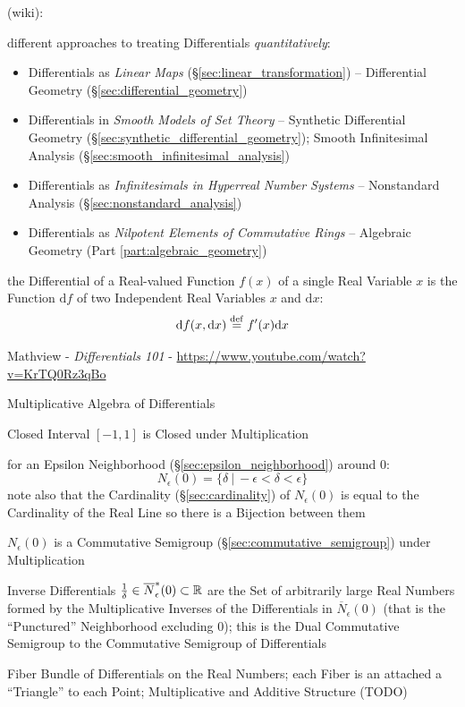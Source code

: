 {(wiki):

different approaches to treating Differentials \emph{quantitatively}:
\begin{itemize}
  \item Differentials as \emph{Linear Maps} (\S\ref{sec:linear_transformation})
    -- Differential Geometry (\S\ref{sec:differential_geometry})
  \item Differentials in \emph{Smooth Models of Set Theory} -- Synthetic
    Differential Geometry (\S\ref{sec:synthetic_differential_geometry}); Smooth
    Infinitesimal Analysis (\S\ref{sec:smooth_infinitesimal_analysis})
  \item Differentials as \emph{Infinitesimals in Hyperreal Number Systems} --
    Nonstandard Analysis (\S\ref{sec:nonstandard_analysis})
  \item Differentials as \emph{Nilpotent Elements of Commutative Rings} --
    Algebraic Geometry (Part \ref{part:algebraic_geometry})
\end{itemize}

the Differential of a Real-valued Function $f(x)$ of a single Real Variable $x$
is the Function $\mathrm{d}f$ of two Independent Real Variables $x$ and
$\mathrm{d}x$:
\[
  \mathrm{d}f(x, \mathrm{d}x) \stackrel{\mathrm{def}}= f'(x)\mathrm{d}x
\]

\asterism

Mathview - \emph{Differentials 101} -
\url{https://www.youtube.com/watch?v=KrTQ0Rz3qBo}

Multiplicative Algebra of Differentials

Closed Interval $[-1, 1]$ is Closed under Multiplication

for an Epsilon Neighborhood (\S\ref{sec:epsilon_neighborhood}) around $0$:
\[
  N_\epsilon(0) = \{ \delta \ |\ -\epsilon < \delta < \epsilon \}
\]
note also that the Cardinality (\S\ref{sec:cardinality}) of $N_\epsilon(0)$ is
equal to the Cardinality of the Real Line so there is a Bijection between them

$N_\epsilon(0)$ is a Commutative Semigroup (\S\ref{sec:commutative_semigroup})
under Multiplication

Inverse Differentials $\frac{1}{\delta} \in \overline{N}_\epsilon^*(0)
\subset \mathbb{R}$ are the Set of arbitrarily large Real Numbers formed by the
Multiplicative Inverses of the Differentials in $\overline{N}_\epsilon(0)$ (that
is the ``Punctured'' Neighborhood excluding $0$); this is the Dual Commutative
Semigroup to the Commutative Semigroup of Differentials

Fiber Bundle of Differentials on the Real Numbers; each Fiber is an attached a
``Triangle'' to each Point; Multiplicative and Additive Structure (TODO)

}
